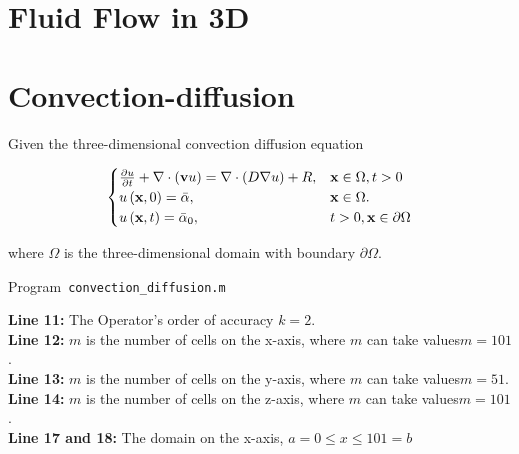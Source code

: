 \section{Fluid Flow in 3D}

\section{Convection-diffusion}
Given the three-dimensional convection diffusion equation

\begin{equation}\label{eq:IBVP3d}
	\begin{cases}
		\diffp{u}{t} + \nabla \cdot (\textbf{v} u) = \nabla \cdot (D \nabla u) + R,
		                                              & \textbf{x} \in \Omega, t > 0          \\
		u\left( \textbf{x},0\right)= \bar{\alpha},
		                                              & \textbf{x} \in  \Omega.               \\
		u\left(\textbf{x},t\right)= \bar{\alpha}_{0}, & t >0, \textbf{x} \in \partial  \Omega
	\end{cases}
\end{equation}

where  $\Omega$  is the three-dimensional domain with  boundary $\partial  \Omega $.

\begin{listing}[ht!]
	\tiny
	\centering
	\caption{Program~\texttt{convection\_diffusion.m}}
	\label{code:convection_diffusion.m}
\end{listing}

\textbf{Line 11:} The Operator's order of accuracy $k = 2$.\\

\textbf{Line 12:} $m$ is the number of cells on the x-axis, where $m$ can take values ​​$m= 101$.\\

\textbf{Line 13:} $m$ is the number of cells on the y-axis, where $m$ can take values ​​$m= 51$.\\

\textbf{Line 14:} $m$ is the number of cells on the z-axis, where $m$ can take values ​​$m= 101$.\\

\textbf{Line 17 and 18:} The domain on the  x-axis, $a=0 \leq x \leq 101=b$\\

